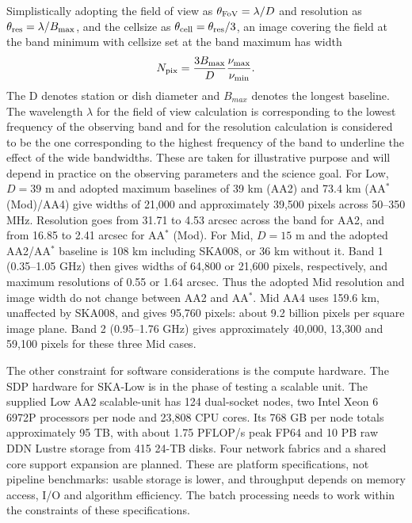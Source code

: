 \documentclass[11pt,twoside]{article}
\begin{document}
Simplistically adopting the field of view as $\theta_{\rm FoV}=\lambda/D$ and resolution as
$\theta_{\rm res}=\lambda/B_{\max}$, and the cellsize as 
$\theta_{\rm cell}=\theta_{\rm res}/3$, an image covering the field at the
band minimum with cellsize set at the band maximum has width
\begin{equation}
 N_{\rm pix}=\frac{3B_{\max}}{D}\frac{\nu_{\max}}{\nu_{\min}}.
 \label{eq:imagewidth}
\end{equation}
The D denotes station or dish diameter and $B_{max}$ denotes the longest baseline. The wavelength $\lambda$ for the field of view calculation is corresponding to the lowest frequency of the observing band and for the resolution calculation is considered to be the one corresponding to the highest frequency of the band to underline the effect of the wide bandwidths. These are taken for illustrative purpose and will depend in practice on the observing parameters and the science goal.
For Low, $D=39$ m and adopted maximum baselines of 39 km (AA2) and
73.4 km (AA$^*$ (Mod)/AA4) give widths of 21,000 and approximately
39,500 pixels across 50--350 MHz.  Resolution goes from 31.71 to
4.53 arcsec across the band for AA2, and from 16.85 to 2.41 arcsec for
AA$^*$ (Mod). For Mid, $D=15$ m and the adopted AA2/AA$^*$ baseline is
108 km including SKA008, or 36 km without it. Band 1 (0.35--1.05 GHz)
then gives widths of 64,800 or 21,600 pixels, respectively, and maximum 
resolutions of 0.55 or 1.64 arcsec. Thus the adopted Mid resolution and
image width do not change between AA2 and AA$^*$. Mid AA4 uses
159.6 km, unaffected by
SKA008, and gives 95,760 pixels: about 9.2 billion pixels per square image
plane. Band 2 (0.95--1.76 GHz) gives approximately 40,000, 13,300 and
59,100 pixels for these three Mid cases. 

The other constraint for software considerations is the compute hardware. 
The SDP hardware for SKA-Low is in the phase of testing a scalable unit.
The supplied Low AA2 scalable-unit has 124 dual-socket nodes,
two Intel Xeon 6 6972P processors per node and 23,808 CPU cores.
Its 768 GB per node totals approximately 95 TB, with about 1.75 PFLOP/s
peak FP64 and 10 PB raw DDN Lustre storage from 415 24-TB disks.
Four network fabrics and a shared core support expansion are planned. These are platform specifications, not pipeline benchmarks: usable storage is lower,
and throughput depends on memory access, I/O and algorithm efficiency. The batch processing needs to work within the constraints of these specifications.
\end{document}
